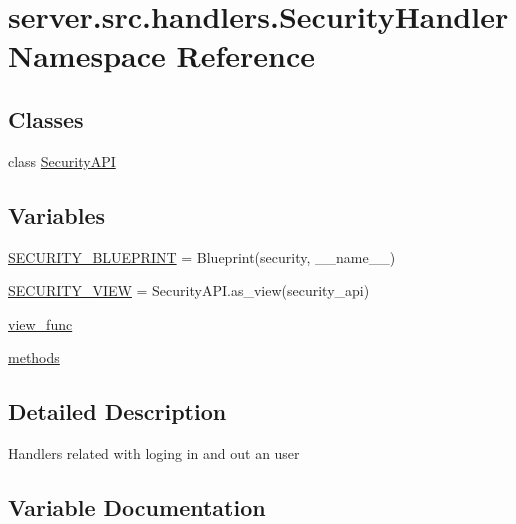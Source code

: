 \hypertarget{namespaceserver_1_1src_1_1handlers_1_1_security_handler}{}\section{server.\+src.\+handlers.\+Security\+Handler Namespace Reference}
\label{namespaceserver_1_1src_1_1handlers_1_1_security_handler}
\subsection*{Classes}
\begin{DoxyCompactItemize}
\item 
class \hyperlink{classserver_1_1src_1_1handlers_1_1_security_handler_1_1_security_a_p_i}{Security\+A\+PI}
\end{DoxyCompactItemize}
\subsection*{Variables}
\begin{DoxyCompactItemize}
\item 
\hyperlink{namespaceserver_1_1src_1_1handlers_1_1_security_handler_abafd35a5560f8a40e2eca6bef3024066}{S\+E\+C\+U\+R\+I\+T\+Y\+\_\+\+B\+L\+U\+E\+P\+R\+I\+NT} = Blueprint(\textquotesingle{}security\textquotesingle{}, \+\_\+\+\_\+name\+\_\+\+\_\+)
\item 
\hyperlink{namespaceserver_1_1src_1_1handlers_1_1_security_handler_a13760d09684005351721e9c4e82afcbd}{S\+E\+C\+U\+R\+I\+T\+Y\+\_\+\+V\+I\+EW} = Security\+A\+P\+I.\+as\+\_\+view(\textquotesingle{}security\+\_\+api\textquotesingle{})
\item 
\hyperlink{namespaceserver_1_1src_1_1handlers_1_1_security_handler_ab4b047d7ba77f3f3a53966cf8171751c}{view\+\_\+func}
\item 
\hyperlink{namespaceserver_1_1src_1_1handlers_1_1_security_handler_ad2b2d768d34647c0b3356732a078c933}{methods}
\end{DoxyCompactItemize}


\subsection{Detailed Description}
\begin{DoxyVerb}Handlers related with loging in and out an user\end{DoxyVerb}
 

\subsection{Variable Documentation}
